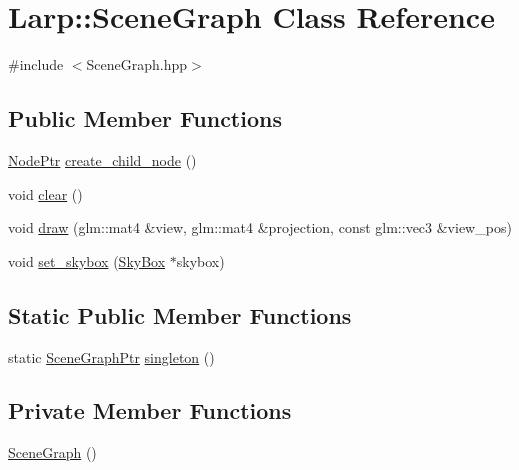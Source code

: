 \hypertarget{classLarp_1_1SceneGraph}{}\section{Larp\+:\+:Scene\+Graph Class Reference}
\label{classLarp_1_1SceneGraph}


{\ttfamily \#include $<$Scene\+Graph.\+hpp$>$}

\subsection*{Public Member Functions}
\begin{DoxyCompactItemize}
\item 
\hyperlink{namespaceLarp_a171c1dc8b70cfb441b15d7386780db23}{Node\+Ptr} \hyperlink{classLarp_1_1SceneGraph_abd2f09bea39c3e15a4c5cd2d9ee7e6a3}{create\+\_\+child\+\_\+node} ()
\item 
void \hyperlink{classLarp_1_1SceneGraph_a21ef2624b18a0e9a0df2ee52db762447}{clear} ()
\item 
void \hyperlink{classLarp_1_1SceneGraph_a128e99a53cc4d30fd3f8f7722194029c}{draw} (glm\+::mat4 \&view, glm\+::mat4 \&projection, const glm\+::vec3 \&view\+\_\+pos)
\item 
void \hyperlink{classLarp_1_1SceneGraph_ac0165b41ce86e4aed2f5c8acd9d4dc27}{set\+\_\+skybox} (\hyperlink{classLarp_1_1SkyBox}{Sky\+Box} $\ast$skybox)
\end{DoxyCompactItemize}
\subsection*{Static Public Member Functions}
\begin{DoxyCompactItemize}
\item 
static \hyperlink{namespaceLarp_acf02d81e4b52238dcd17cb6249eadadc}{Scene\+Graph\+Ptr} \hyperlink{classLarp_1_1SceneGraph_a569504ef263e392f9376bd50bb09a912}{singleton} ()
\end{DoxyCompactItemize}
\subsection*{Private Member Functions}
\begin{DoxyCompactItemize}
\item 
\hyperlink{classLarp_1_1SceneGraph_a256e0ff974a0f905a848a99f18b7ffc4}{Scene\+Graph} ()
\end{DoxyCompactItemize}

